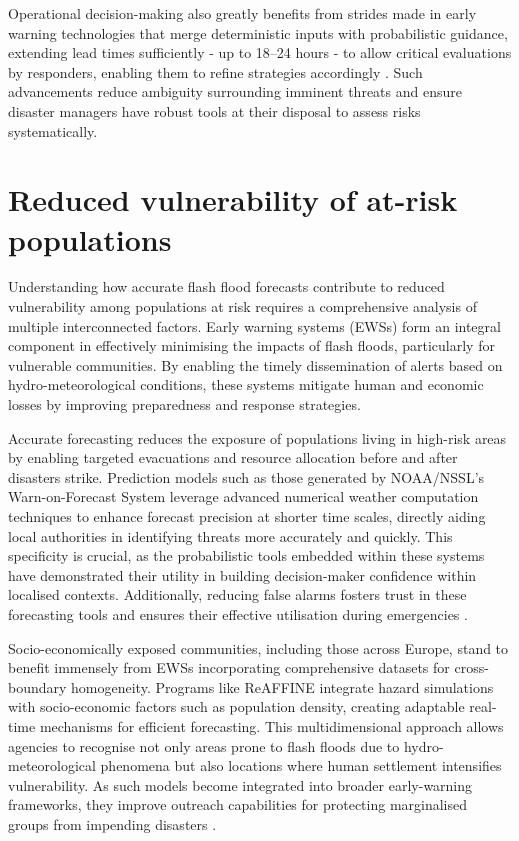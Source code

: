 Operational decision-making also greatly benefits from strides made in early warning technologies that merge deterministic inputs with probabilistic guidance, extending lead times sufficiently - up to 18–24 hours - to allow critical evaluations by responders, enabling them to refine strategies accordingly \citep{Poolman2014}. Such advancements reduce ambiguity surrounding imminent threats and ensure disaster managers have robust tools at their disposal to assess risks systematically.


\section{Reduced vulnerability of at-risk populations}

Understanding how accurate flash flood forecasts contribute to reduced vulnerability among populations at risk requires a comprehensive analysis of multiple interconnected factors. Early warning systems (EWSs) form an integral component in effectively minimising the impacts of flash floods, particularly for vulnerable communities. By enabling the timely dissemination of alerts based on hydro-meteorological conditions, these systems mitigate human and economic losses by improving preparedness and response strategies.

Accurate forecasting reduces the exposure of populations living in high-risk areas by enabling targeted evacuations and resource allocation before and after disasters strike. Prediction models such as those generated by NOAA/NSSL's Warn-on-Forecast System leverage advanced numerical weather computation techniques to enhance forecast precision at shorter time scales, directly aiding local authorities in identifying threats more accurately and quickly. This specificity is crucial, as the probabilistic tools embedded within these systems have demonstrated their utility in building decision-maker confidence within localised contexts. Additionally, reducing false alarms fosters trust in these forecasting tools and ensures their effective utilisation during emergencies \citep{Martinaitis2023}.

Socio-economically exposed communities, including those across Europe, stand to benefit immensely from EWSs incorporating comprehensive datasets for cross-boundary homogeneity. Programs like ReAFFINE integrate hazard simulations with socio-economic factors such as population density, creating adaptable real-time mechanisms for efficient forecasting. This multidimensional approach allows agencies to recognise not only areas prone to flash floods due to hydro-meteorological phenomena but also locations where human settlement intensifies vulnerability. As such models become integrated into broader early-warning frameworks, they improve outreach capabilities for protecting marginalised groups from impending disasters \citep{Ritter2021a}.

